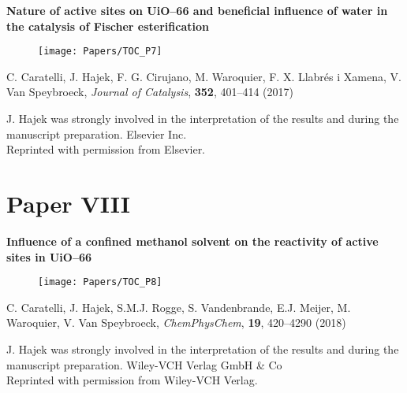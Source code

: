 \vspace{0.1\textheight}
{
\large
\textbf{Nature of active sites on UiO--66 and beneficial influence of water in
the catalysis of Fischer esterification} }
\begin{figure}[h!]
	\centering
	\texttt{[image: Papers/TOC\_P7]}
\end{figure}
 
\noindent
C. Caratelli, J. Hajek, F. G. Cirujano, M. Waroquier, F. X. Llabr\'es i Xamena, V.
Van Speybroeck, \textit{Journal of Catalysis}, \textbf{352}, 401--414 (2017)
\npar

\vfill
\noindent J. Hajek was strongly involved in the interpretation of the results
and during the manuscript preparation.
\npar
\noindent {} Elsevier Inc. \\
Reprinted with permission from Elsevier.

\clearpage{\pagestyle{empty}\cleardoublepage}

 

\clearpage{\pagestyle{empty}\cleardoublepage}


\section*{Paper VIII}

\vspace{0.1\textheight}
{
\large
\textbf{Influence of a confined methanol solvent on the reactivity of active
sites in UiO--66} }
\begin{figure}[h!]
	\centering
	\texttt{[image: Papers/TOC\_P8]}
\end{figure}
 
\noindent
C. Caratelli, J. Hajek, S.M.J. Rogge, S. Vandenbrande, E.J. Meijer, M.
Waroquier, V. Van Speybroeck, \textit{ChemPhysChem}, \textbf{19}, 420--4290
(2018)
\npar

\vfill
\noindent J. Hajek was strongly involved in the interpretation of the results
and during the manuscript preparation.
\npar
\noindent {} Wiley-VCH Verlag GmbH \& Co \\
Reprinted with permission from Wiley-VCH Verlag.

\clearpage{\pagestyle{empty}\cleardoublepage}

 

